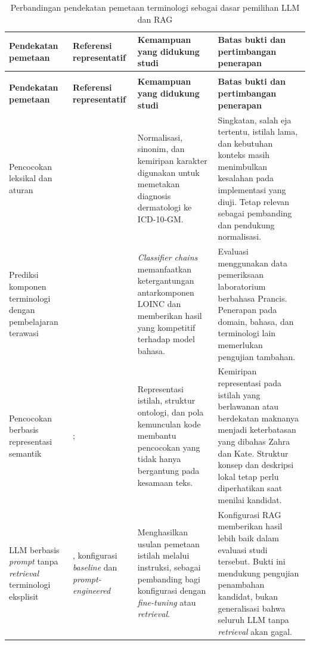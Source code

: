\begingroup
\small
{}
\setlength{\tabcolsep}{4pt}
\renewcommand{\arraystretch}{1.12}
\begin{longtable}{@{}>{\raggedright\arraybackslash}p{}>{\raggedright\arraybackslash}p{}>{\raggedright\arraybackslash}p{}>{\raggedright\arraybackslash}p{}@{}}
\caption{Perbandingan pendekatan pemetaan terminologi sebagai dasar pemilihan LLM dan RAG}\label{tab:dasar-pemilihan-llm-rag}\\
\toprule
\textbf{Pendekatan pemetaan} & \textbf{Referensi representatif} & \textbf{Kemampuan yang didukung studi} & \textbf{Batas bukti dan pertimbangan penerapan} \\
\midrule
\endfirsthead
\multicolumn{4}{l}{\textit{Tabel \thetable\ (lanjutan)}}\\
\toprule
\textbf{Pendekatan pemetaan} & \textbf{Referensi representatif} & \textbf{Kemampuan yang didukung studi} & \textbf{Batas bukti dan pertimbangan penerapan} \\
\midrule
\endhead
\midrule
\endfoot
\bottomrule
\endlastfoot
Pencocokan leksikal dan aturan & \citet{sitaru_digitalising_2024} & Normalisasi, sinonim, dan kemiripan karakter digunakan untuk memetakan diagnosis dermatologi ke ICD-10-GM. & Singkatan, salah eja tertentu, istilah lama, dan kebutuhan konteks masih menimbulkan kesalahan pada implementasi yang diuji. Tetap relevan sebagai pembanding dan pendukung normalisasi. \\
\midrule
Prediksi komponen terminologi dengan pembelajaran terawasi & \citet{michel-picque_classifier_2024} & \textit{Classifier chains} memanfaatkan ketergantungan antarkomponen LOINC dan memberikan hasil yang kompetitif terhadap model bahasa. & Evaluasi menggunakan data pemeriksaan laboratorium berbahasa Prancis. Penerapan pada domain, bahasa, dan terminologi lain memerlukan pengujian tambahan. \\
\midrule
Pencocokan berbasis representasi semantik & \citet{zahra_obtaining_2024}; \citet{zhou_multiview_2022} & Representasi istilah, struktur ontologi, dan pola kemunculan kode membantu pencocokan yang tidak hanya bergantung pada kesamaan teks. & Kemiripan representasi pada istilah yang berlawanan atau berdekatan maknanya menjadi keterbatasan yang dibahas Zahra dan Kate. Struktur konsep dan deskripsi lokal tetap perlu diperhatikan saat menilai kandidat. \\
\midrule
LLM berbasis \textit{prompt} tanpa \textit{retrieval} terminologi eksplisit & \citet{huh_comparative_2025}, konfigurasi \textit{baseline} dan \textit{prompt-engineered} & Menghasilkan usulan pemetaan istilah melalui instruksi, sebagai pembanding bagi konfigurasi dengan \textit{fine-tuning} atau \textit{retrieval}. & Konfigurasi RAG memberikan hasil lebih baik dalam evaluasi studi tersebut. Bukti ini mendukung pengujian penambahan kandidat, bukan generalisasi bahwa seluruh LLM tanpa \textit{retrieval} akan gagal. \\

\end{longtable}
